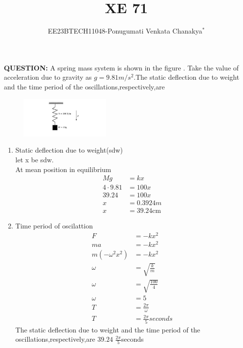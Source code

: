 \documentclass[journal,12pt,twocolumn]{IEEEtran}
\theoremstyle{remark}
\begin{document}
 
 \vspace{3cm}
 \title{\textbf{XE 71}}
 \author{EE23BTECH11048-Ponugumati Venkata Chanakya$^{*}$%
 }
 \maketitle
 \newpage
 \bigskip
 \renewcommand{\thefigure}{\theenumi}
 \renewcommand{\thetable}{\theenumi}
 \textbf{QUESTION:}
 A spring mass system is shown in the figure . Take the value of acceleration  due to gravity as $g=9.81m/s^2$.The static deflection due to weight and the time period of the oscillations,respectively,are\\
 \begin{figure}[h!]
    \centering
    \includegraphics[width=0.4\textwidth]{figs/fig1.jpg}
    \caption{ }
    \label{fig}
\end{figure}

\solution
\begin{enumerate}
    \item Static deflection due to weight(sdw)\\
    let x be sdw.\\
    At mean position in equilibrium\\
    \begin{align}
        Mg&=kx\\
        4\cdot9.81&=100x\\
        39.24&=100x\\
        x&=0.3924m\\
        x&=39.24 \text{cm}
    \end{align}
     \item Time period of oscilattion\\
     \begin{align}
           F&=-kx^2\\
           ma&=-kx^2\\
           m(-\omega^2 x^2)&=-kx^2\\
           \omega &= \sqrt{\frac{k}{m}}\\
           \omega&=\sqrt{\frac{100}{4}}\\
           \omega&=5\\
           T&=\frac{2\pi}{\omega}\\
           T&=\frac{2\pi}{5}seconds
     \end{align}
    The static deflection due to weight and the time period of the oscillations,respectively,are $39.24$ $\frac{2\pi}{5}$seconds
\end{enumerate}
\end{document}

